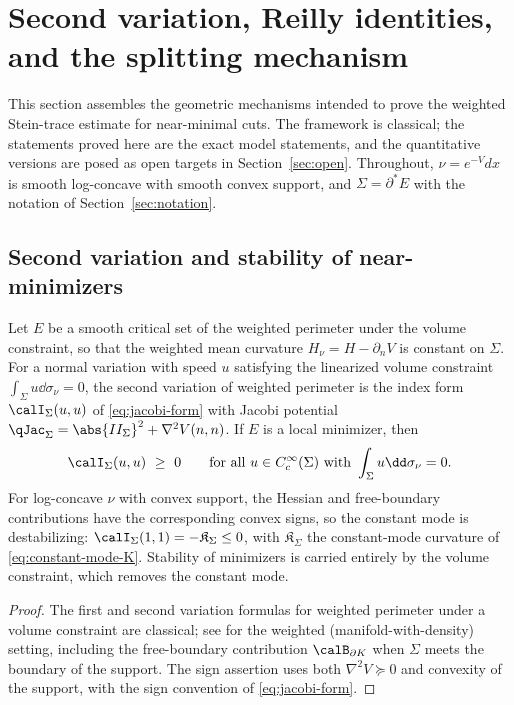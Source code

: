 \documentclass[../../main.tex]{subfiles}
\begin{document}
\section{Second variation, Reilly identities, and the splitting mechanism}
\label{sec:jacobi}

This section assembles the geometric mechanisms intended to prove the weighted Stein-trace
estimate for near-minimal cuts. The framework is classical; the statements proved here are the
exact model statements, and the quantitative versions are posed as open targets in
Section~\ref{sec:open}. Throughout, $\nu=e^{-V}dx$ is smooth log-concave with smooth convex
support, and $\Sigma=\partial^*E$ with the notation of Section~\ref{sec:notation}.

\subsection{Second variation and stability of near-minimizers}

\begin{proposition}
\label{prop:second-variation}
Let $E$ be a smooth critical set of the weighted perimeter under the volume constraint, so
that the weighted mean curvature $H_\nu=H-\partial_nV$ is constant on $\Sigma$. For a normal
variation with speed $u$ satisfying the linearized volume constraint
$\int_\Sigma u\dd\sigma_\nu=0$, the second variation of weighted perimeter is the index form
$\calI_\Sigma(u,u)$ of \eqref{eq:jacobi-form} with Jacobi potential
$\qJac_\Sigma=\abs{II_\Sigma}^2+\nabla^2V(n,n)$. If $E$ is a local minimizer, then
\begin{equation}\label{eq:stability}
  \calI_\Sigma(u,u)\ \ge\ 0
  \qquad\text{for all }u\in C_c^\infty(\Sigma)\text{ with }\int_\Sigma u\dd\sigma_\nu=0 .
\end{equation}
For log-concave $\nu$ with convex support, the Hessian and free-boundary contributions have the
corresponding convex signs, so the constant mode is destabilizing:
$\calI_\Sigma(1,1)=-\mathfrak K_\Sigma\le0$, with $\mathfrak K_\Sigma$
the constant-mode curvature of \eqref{eq:constant-mode-K}. Stability of minimizers is carried
entirely by the volume constraint, which removes the constant mode.
\end{proposition}

\begin{proof}
The first and second variation formulas for weighted perimeter under a volume constraint are
classical; see \cite{Bayle2004,BayleRosales2003,Rosales2014,Milman2009Isoperimetric} for the
weighted (manifold-with-density) setting, including the free-boundary contribution
$\calB_{\partial K}$ when $\Sigma$ meets the boundary of the support. The sign assertion uses
both $\nabla^2V\succeq0$ and convexity of the support, with the sign convention of
\eqref{eq:jacobi-form}.
\end{proof}
\end{document}
